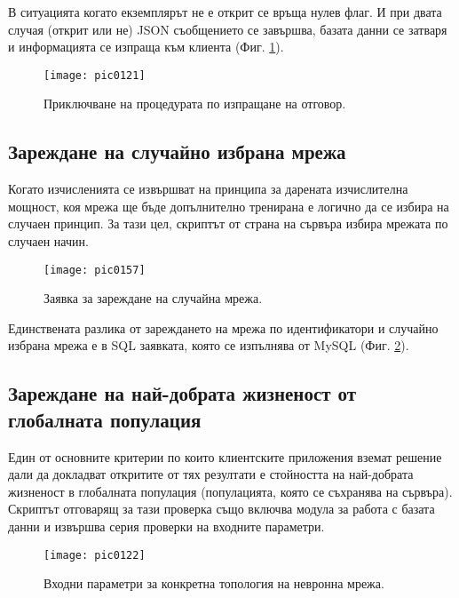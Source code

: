 В ситуацията когато екземплярът не е открит се връща нулев флаг. И при двата случая (открит или не) JSON съобщението се завършва, базата данни се затваря и информацията се изпраща към клиента (Фиг. \ref{fig:pic0121}).

\begin{figure}[h]
  \centering
  \texttt{[image: pic0121]}
  \caption{Приключване на процедурата по изпращане на отговор.}
\label{fig:pic0121}
\end{figure}
\FloatBarrier

\subsection{Зареждане на случайно избрана мрежа}

Когато изчисленията се извършват на принципа за дарената изчислителна мощност, коя мрежа ще бъде допълнително тренирана е логично да се избира на случаен принцип. За тази цел, скриптът от страна на сървъра избира мрежата по случаен начин.

\begin{figure}[h]
  \centering
  \texttt{[image: pic0157]}
  \caption{Заявка за зареждане на случайна мрежа.}
\label{fig:pic0157}
\end{figure}
\FloatBarrier

Единствената разлика от зареждането на мрежа по идентификатори и случайно избрана мрежа е в SQL заявката, която се изпълнява от MySQL (Фиг. \ref{fig:pic0157}).

\subsection{Зареждане на най-добрата жизненост от глобалната популация}

Един от основните критерии по които клиентските приложения вземат решение дали да докладват откритите от тях резултати е стойността на най-добрата жизненост в глобалната популация (популацията, която се съхранява на сървъра). Скриптът отговарящ за тази проверка също включва модула за работа с базата данни и извършва серия проверки на входните параметри. 

\begin{figure}[h]
  \centering
  \texttt{[image: pic0122]}
  \caption{Входни параметри за конкретна топология на невронна мрежа.}
\label{fig:pic0122}
\end{figure}
\FloatBarrier

